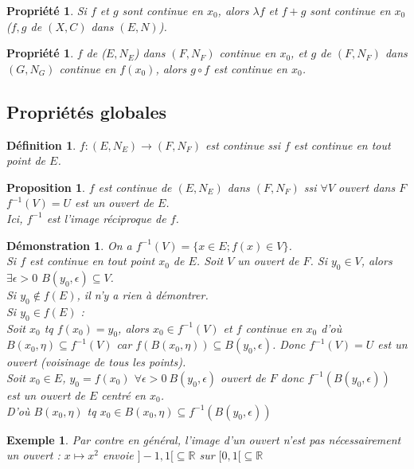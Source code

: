 \documentclass[a4paper, oneside]{report}
\theoremstyle{break}
\newtheorem{defi}[thm]{Définition}
\newtheorem{propr}[thm]{Propriété}
\newtheorem{propo}[thm]{Proposition}
\newtheorem{exem}[thm]{Exemple}
\newtheorem*{demo}{Démonstration}
\newcommand{\R}{\mathbb{R}}
\begin{document}
\begin{propr}
Si $f$ et $g$ sont continue en $x_0$, alors $\lambda f$ et $f+g$ sont continue en $x_0$ ($f,g$ de $(X,C)$ dans $(E,N)$).
\end{propr}


\begin{propr}
$f$ de ($E,N_E$) dans $(F,N_F)$ continue en $x_0$, et $g$ de $(F,N_F)$ dans $(G,N_G)$ continue en $f(x_0)$, alors $g\circ f$ est continue en $x_0$.
\end{propr}


\subsection{Propriétés globales}

\begin{defi}
$f:(E,N_E)\rightarrow (F,N_F)$ est continue ssi $f$ est continue en tout point de $E$.
\end{defi}
\begin{propo}
$f$ est continue de $(E,N_E)$ dans $(F,N_F)$ ssi $\forall V$ ouvert dans $F$ $f^{-1}(V)=U$ est un ouvert de $E$.\\
Ici, $f^{-1}$ est l'image réciproque de $f$.
\end{propo}


\begin{demo}
On a $f^{-1}(V)=\{x\in E; f(x)\in V \}$.\\

Si $f$ est continue en tout point $x_0$ de $E$. Soit $V$ un ouvert de $F$. Si $y_0 \in V$, alors $\exists \epsilon >0$ $B(y_0,\epsilon)\subseteq V$.\\
Si $y_0 \notin f(E)$, il n'y a rien à démontrer.\\
Si $y_0\in f(E)$ :\\
Soit $x_0$ tq $f(x_0)=y_0$, alors $x_0\in f^{-1}(V)$ et $f$ continue en $x_0$ d'où $B(x_0,\eta) \subseteq f^{-1}(V)$ car $f(B(x_0,\eta))\subseteq B(y_0,\epsilon)$. Donc $f^{-1}(V)=U$ est un ouvert (voisinage de tous les points).\\

Soit $x_0\in E$, $y_0=f(x_0)$ $\forall \epsilon >0~B(y_0,\epsilon)$ ouvert de $F$ donc $f^{-1}(B(y_0,\epsilon))$ est un ouvert de $E$ centré en $x_0$.\\
D'où $B(x_0,\eta)$ tq $x_0 \in B(x_0,\eta)\subseteq f^{-1}(B(y_0,\epsilon))$
\end{demo}


\begin{exem}

Par contre en général, l'image d'un ouvert n'est pas nécessairement un ouvert :
$x\mapsto x^2$ envoie $]-1,1[\subseteq\R$ sur $[0,1[\subseteq \R$
\end{exem}
\end{document}
